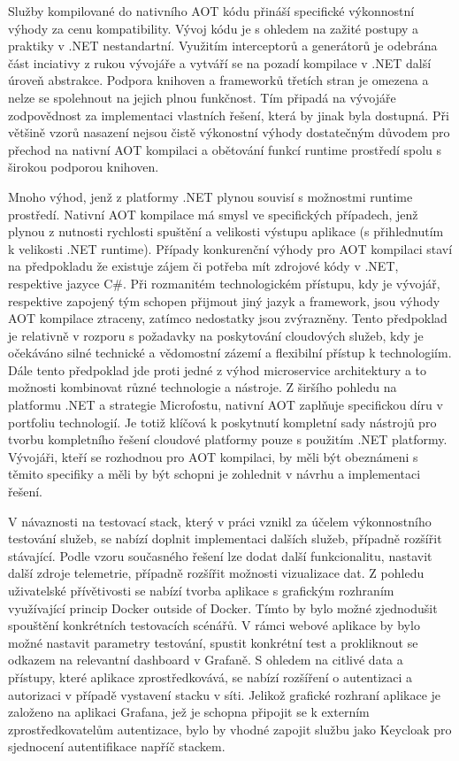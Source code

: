 Služby kompilované do nativního AOT kódu přináší specifické výkonnostní výhody za cenu kompatibility. Vývoj kódu je s ohledem na zažité postupy a praktiky v .NET nestandartní. Využitím interceptorů a generátorů je odebrána část inciativy z rukou vývojáře a vytváří se na pozadí kompilace v .NET další úroveň abstrakce. Podpora knihoven a frameworků třetích stran je omezena a nelze se spolehnout na jejich plnou funkčnost. Tím připadá na vývojáře zodpovědnost za implementaci vlastních řešení, která by jinak byla dostupná. Při většině vzorů nasazení nejsou čistě výkonostní výhody dostatečným důvodem pro přechod na nativní AOT kompilaci a obětování funkcí runtime prostředí spolu s širokou podporou knihoven.

Mnoho výhod, jenž z platformy .NET plynou souvisí s možnostmi runtime prostředí. Nativní AOT kompilace má smysl ve specifických případech, jenž plynou z nutnosti rychlosti spuštění a velikosti výstupu aplikace (s přihlednutím k velikosti .NET runtime). Případy konkurenční výhody pro AOT kompilaci staví na předpokladu že existuje zájem či potřeba mít zdrojové kódy v .NET, respektive jazyce C\#. Při rozmanitém technologickém přístupu, kdy je vývojář, respektive zapojený tým schopen přijmout jiný jazyk a framework, jsou výhody AOT kompilace ztraceny, zatímco nedostatky jsou zvýrazněny. Tento předpoklad je relativně v rozporu s požadavky na poskytování cloudových služeb, kdy je očekáváno silné technické a vědomostní zázemí a flexibilní přístup k technologiím. Dále tento předpoklad jde proti jedné z výhod microservice architektury a to možnosti kombinovat různé technologie a nástroje. Z širšího pohledu na platformu .NET a strategie Microfostu, nativní AOT zaplňuje specifickou díru v portfoliu technologií. Je totiž klíčová k poskytnutí kompletní sady nástrojů pro tvorbu kompletního řešení cloudové platformy pouze s použitím .NET platformy. Vývojáři, kteří se rozhodnou pro AOT kompilaci, by měli být obeznámeni s těmito specifiky a měli by být schopni je zohlednit v návrhu a implementaci řešení.

V návaznosti na testovací stack, který v práci vznikl za účelem výkonnostního testování služeb, se nabízí doplnit implementaci dalších služeb, případně rozšířit stávající. Podle vzoru současného řešení lze dodat další funkcionalitu, nastavit další zdroje telemetrie, případně rozšířit možnosti vizualizace dat. Z pohledu uživatelské přívětivosti se nabízí tvorba aplikace s grafickým rozhraním využívající princip Docker outside of Docker. Tímto by bylo možné zjednodušit spouštění konkrétních testovacích scénářů. V rámci webové aplikace by bylo možné nastavit parametry testování, spustit konkrétní test a prokliknout se odkazem na relevantní dashboard v Grafaně. S ohledem na citlivé data a přístupy, které aplikace zprostředkovává, se nabízí rozšíření o autentizaci a autorizaci v případě vystavení stacku v síti. Jelikož grafické rozhraní aplikace je založeno na aplikaci Grafana, jež je schopna připojit se k externím zprostředkovatelům autentizace, bylo by vhodné zapojit službu jako Keycloak pro sjednocení autentifikace napříč stackem.
